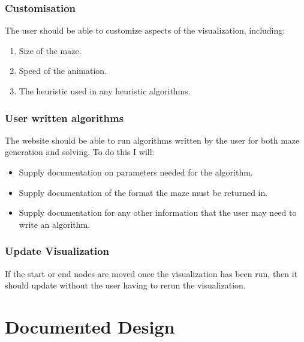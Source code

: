 \documentclass[titlepage]{article}
\begin{document}
\subsubsection{Customisation}
The user should be able to customize aspects of the visualization, including:
\begin{enumerate}
    \item Size of the maze.
    \item Speed of the animation.
    \item The heuristic used in any heuristic algorithms.
\end{enumerate}

\subsubsection{User written algorithms}
The website should be able to run algorithms written by the user for both maze generation and solving. To do this I will:
\begin{itemize}
    \item Supply documentation on parameters needed for the algorithm.
    \item Supply documentation of the format the maze must be returned in.
    \item Supply documentation for any other information that the user may need to write an algorithm.
\end{itemize}

\subsubsection{Update Visualization}
If the start or end nodes are moved once the visualization has been run, then it should update without the user having to rerun the visualization.

\section{Documented Design}
\end{document}
